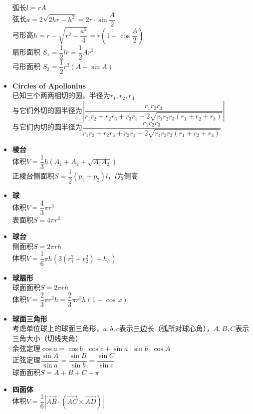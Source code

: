 \begin{itemize}[nosep, wide=0pt]
            \\弧长$ l = r A $
            \\弦长$ a = 2 \sqrt{2 h r - h^2} = 2 r \cdot \sin \dfrac{A}{2} $
            \\弓形高$ h = r - \sqrt{r^2 - \dfrac{a^2}{4}} = r (1 - \cos \dfrac{A}{2}) $
            \\扇形面积 $ S_1 = \dfrac{1}{2} l r = \dfrac{1}{2} A r^2 $
            \\弓形面积 $ S_2 = \dfrac{1}{2} r^2 (A - \sin A) $
        \item \textbf{Circles of Apollonius}
            \\已知三个两两相切的圆，半径为$ r_1, r_2, r_3 $
            \\与它们外切的圆半径为$ \left| \dfrac{r_1 r_2 r_3}{r_1 r_2 + r_2 r_3 + r_3 r_1 - 2 \sqrt{r_1 r_2 r_3 (r_1 + r_2 + r_3)}} \right| $
            \\与它们内切的圆半径为$ \dfrac{r_1 r_2 r_3}{r_1 r_2 + r_2 r_3 + r_3 r_1 + 2 \sqrt{r_1 r_2 r_3 (r_1 + r_2 + r_3)}} $
        \item \textbf{棱台}
            \\体积$ V = \dfrac{1}{3} h (A_1 + A_2 + \sqrt{A_1 A_2}) $
            \\正棱台侧面积$ S = \dfrac{1}{2} (p_1 + p_2) l $，$ l $为侧高
        \item \textbf{球}
            \\体积$ V = \dfrac{4}{3} \pi r^3 $
            \\表面积$ S = 4 \pi r^2 $
        \item \textbf{球台}
            \\侧面积$ S = 2 \pi r h $
            \\体积$ V = \dfrac{1}{6} \pi h (3(r_1^2 + r_2^2) + h_h) $
        \item \textbf{球扇形}
            \\球面面积$ S = 2 \pi r h $
            \\体积$ V = \dfrac{2}{3} \pi r^2 h = \dfrac{2}{3} \pi r^3 h (1 - \cos \varphi) $
        \item \textbf{球面三角形}
            \\考虑单位球上的球面三角形，$ a, b, c $表示三边长（弧所对球心角），$ A, B, C $表示三角大小（切线夹角）
            \\余弦定理$ \cos a = \cos b \cdot \cos c + \sin a \cdot \sin b \cdot \cos A $
            \\正弦定理$ \dfrac{\sin A}{\sin a} = \dfrac{\sin B}{\sin b} = \dfrac{\sin C}{\sin c} $
            \\球面面积$ S = A + B + C - \pi $
        \item \textbf{四面体}
            \\体积$ V = \dfrac{1}{6} \left| \overrightarrow{AB} \cdot (\overrightarrow{AC} \times \overrightarrow{AD}) \right| $
    \end{itemize}
